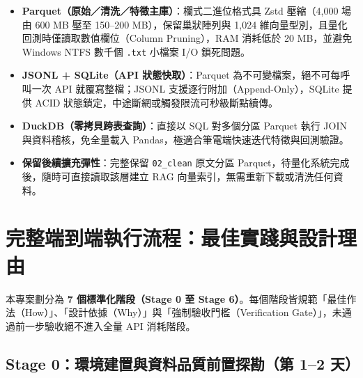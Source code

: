 \documentclass[11pt, a4paper]{article}
\begin{document}
\begin{whybox}
\begin{itemize}[leftmargin=1.4em, itemsep=2pt]
    \item \textbf{Parquet（原始／清洗／特徵主庫）}：欄式二進位格式具 Zstd 壓縮（4,000 場由 600 MB 壓至 150--200 MB），保留巢狀陣列與 1,024 維向量型別，且量化回測時僅讀取數值欄位（Column Pruning），RAM 消耗低於 20 MB，並避免 Windows NTFS 數千個 \texttt{.txt} 小檔案 I/O 鎖死問題。
    \item \textbf{JSONL + SQLite（API 狀態快取）}：Parquet 為不可變檔案，絕不可每呼叫一次 API 就覆寫整檔；JSONL 支援逐行附加（Append-Only），SQLite 提供 ACID 狀態鎖定，中途斷網或觸發限流可秒級斷點續傳。
    \item \textbf{DuckDB（零拷貝跨表查詢）}：直接以 SQL 對多個分區 Parquet 執行 JOIN 與資料稽核，免全量載入 Pandas，極適合筆電端快速迭代特徵與回測驗證。
    \item \textbf{保留後續擴充彈性}：完整保留 \texttt{02\_clean} 原文分區 Parquet，待量化系統完成後，隨時可直接讀取該層建立 RAG 向量索引，無需重新下載或清洗任何資料。
\end{itemize}
\end{whybox}

\section{完整端到端執行流程：最佳實踐與設計理由}

本專案劃分為 \textbf{7 個標準化階段（Stage 0 至 Stage 6）}。每個階段皆規範「最佳作法（How）」、「設計依據（Why）」與「強制驗收門檻（Verification Gate）」，未通過前一步驗收絕不進入全量 API 消耗階段。

\subsection{Stage 0：環境建置與資料品質前置探勘（第 1--2 天）}
\end{document}

